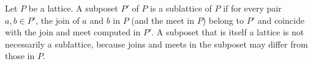 Let $P$ be a lattice. A subposet $P'$ of $P$ is a sublattice of $P$ if for every pair $a, b \in P'$, the join of $a$ and $b$ in $P$ (and the meet in $P$) belong to $P'$ and coincide with the join and meet computed in $P'$. A subposet that is itself a lattice is not necessarily a sublattice, because joins and meets in the subposet may differ from those in $P$.

